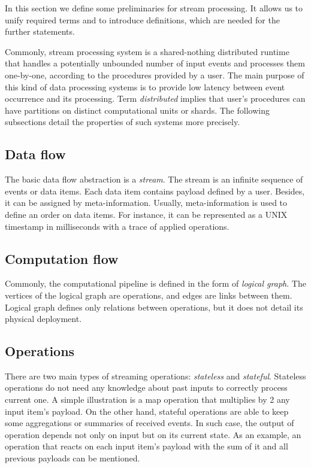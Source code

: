 
\label {fs-stream}

In this section we define some preliminaries for stream processing. It allows us to unify required terms and to introduce definitions, which are needed for the further statements.

Commonly, stream processing system is a shared-nothing distributed runtime that handles a potentially unbounded number of input events and processes them one-by-one, according to the procedures provided by a user. The main purpose of this kind of data processing systems is to provide low latency between event occurrence and its processing. Term {\it distributed} implies that user's procedures can have partitions on distinct computational units or shards. The following subsections detail the properties of such systems more precisely.  

\subsection{Data flow}
The basic data flow abstraction is a {\it stream}. The stream is an infinite sequence of events or data items. Each data item contains payload defined by a user. Besides, it can be assigned by meta-information. Usually, meta-information is used to define an order on data items. For instance, it can be represented as a UNIX timestamp in milliseconds with a trace of applied operations.

\subsection{Computation flow}
Commonly, the computational pipeline is defined in the form of {\it logical graph}. The vertices of the logical graph are operations, and edges are links between them. Logical graph defines only relations between operations, but it does not detail its physical deployment.    

\subsection{Operations}
There are two main types of streaming operations: {\it stateless} and {\it stateful}. Stateless operations do not need any knowledge about past inputs to correctly process current one. A simple illustration is a map operation that multiplies by 2 any input item's payload. On the other hand, stateful operations are able to keep some aggregations or summaries of received events. In such case, the output of operation depends not only on input but on its current state. As an example, an operation that reacts on each input item's payload with the sum of it and all previous payloads can be mentioned. 

